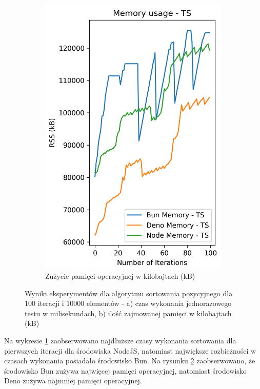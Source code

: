 \begin{figure}[H]
\begin{subfigure}[b]{0.44\textwidth}
    \label{fig:radix_sorting_e3_ts_time}
  \end{subfigure}
  \begin{subfigure}[b]{0.44\textwidth}
    \centering
    \includegraphics[width=\textwidth]{Figures/sorting/sorting_radix_100_10000_ts_memory.png}
    \caption{Zużycie pamięci operacyjnej w kilobajtach (kB)}
    \label{fig:radix_sorting_e3_ts_memory}
  \end{subfigure}
  \hfill
  \caption{Wyniki eksperymentów dla algorytmu sortowania pozycyjnego dla 100 iteracji i 10000 elementów - a) czas wykonania jednorazowego testu w milisekundach, b) ilość zajmowanej pamięci w kilobajtach (kB)}
  \label{fig:radix_sorting_e3_ts}
\end{figure}

Na wykresie \ref{fig:radix_sorting_e3_ts_time} zaobserwowano najdłuższe czasy wykonania sortowania dla pierwszych iteracji dla środowiska NodeJS, natomiast największe rozbieżności w czasach wykonania posiadało środowisko Bun. Na rysunku \ref{fig:radix_sorting_e3_ts_memory} zaobserwowano, że środowisko Bun zużywa najwięcej pamięci operacyjnej, natomiast środowisko Deno zużywa najmniej pamięci operacyjnej.

